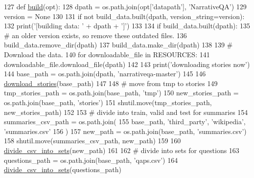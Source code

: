 \begin{DoxyCode}
127 \textcolor{keyword}{def }\hyperlink{namespacedialog__babi__feedback_1_1build_a7a9d289f7493a5ded13c4b7f071b6184}{build}(opt):
128     dpath = os.path.join(opt[\textcolor{stringliteral}{'datapath'}], \textcolor{stringliteral}{'NarrativeQA'})
129     version = \textcolor{keywordtype}{None}
130 
131     \textcolor{keywordflow}{if} \textcolor{keywordflow}{not} build\_data.built(dpath, version\_string=version):
132         print(\textcolor{stringliteral}{'[building data: '} + dpath + \textcolor{stringliteral}{']'})
133 
134         \textcolor{keywordflow}{if} build\_data.built(dpath):
135             \textcolor{comment}{# an older version exists, so remove these outdated files.}
136             build\_data.remove\_dir(dpath)
137         build\_data.make\_dir(dpath)
138 
139         \textcolor{comment}{# Download the data.}
140         \textcolor{keywordflow}{for} downloadable\_file \textcolor{keywordflow}{in} RESOURCES:
141             downloadable\_file.download\_file(dpath)
142 
143         print(\textcolor{stringliteral}{'downloading stories now'})
144         base\_path = os.path.join(dpath, \textcolor{stringliteral}{'narrativeqa-master'})
145 
146         \hyperlink{namespaceparlai_1_1tasks_1_1narrative__qa_1_1build_afd6f28e1efb7e9f3328eef166f8be5cb}{download\_stories}(base\_path)
147 
148         \textcolor{comment}{# move from tmp to stories}
149         tmp\_stories\_path = os.path.join(base\_path, \textcolor{stringliteral}{'tmp'})
150         new\_stories\_path = os.path.join(base\_path, \textcolor{stringliteral}{'stories'})
151         shutil.move(tmp\_stories\_path, new\_stories\_path)
152 
153         \textcolor{comment}{# divide into train, valid and test for summaries}
154         summaries\_csv\_path = os.path.join(
155             base\_path, \textcolor{stringliteral}{'third\_party'}, \textcolor{stringliteral}{'wikipedia'}, \textcolor{stringliteral}{'summaries.csv'}
156         )
157         new\_path = os.path.join(base\_path, \textcolor{stringliteral}{'summaries.csv'})
158         shutil.move(summaries\_csv\_path, new\_path)
159 
160         \hyperlink{namespaceparlai_1_1tasks_1_1narrative__qa_1_1build_a104cbf949215e7b505c73b33017b1970}{divide\_csv\_into\_sets}(new\_path)
161 
162         \textcolor{comment}{# divide into sets for questions}
163         questions\_path = os.path.join(base\_path, \textcolor{stringliteral}{'qaps.csv'})
164         \hyperlink{namespaceparlai_1_1tasks_1_1narrative__qa_1_1build_a104cbf949215e7b505c73b33017b1970}{divide\_csv\_into\_sets}(questions\_path)

\end{DoxyCode}
